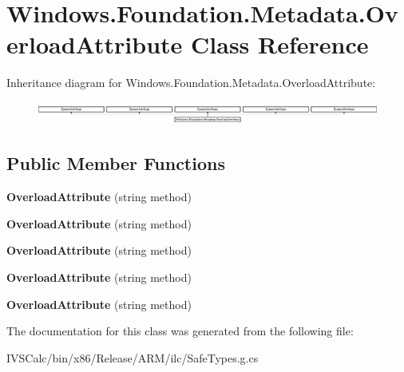 \hypertarget{class_windows_1_1_foundation_1_1_metadata_1_1_overload_attribute}{}\section{Windows.\+Foundation.\+Metadata.\+Overload\+Attribute Class Reference}
\label{class_windows_1_1_foundation_1_1_metadata_1_1_overload_attribute}
Inheritance diagram for Windows.\+Foundation.\+Metadata.\+Overload\+Attribute\+:\begin{figure}[H]
\begin{center}
\leavevmode
\includegraphics[height=0.754209cm]{class_windows_1_1_foundation_1_1_metadata_1_1_overload_attribute}
\end{center}
\end{figure}
\subsection*{Public Member Functions}
\begin{DoxyCompactItemize}
\item 
\mbox{\label{class_windows_1_1_foundation_1_1_metadata_1_1_overload_attribute_a9c4128021b8cc515bccee33fedad6a54}} 
{\bfseries Overload\+Attribute} (string method)
\item 
\mbox{\label{class_windows_1_1_foundation_1_1_metadata_1_1_overload_attribute_a9c4128021b8cc515bccee33fedad6a54}} 
{\bfseries Overload\+Attribute} (string method)
\item 
\mbox{\label{class_windows_1_1_foundation_1_1_metadata_1_1_overload_attribute_a9c4128021b8cc515bccee33fedad6a54}} 
{\bfseries Overload\+Attribute} (string method)
\item 
\mbox{\label{class_windows_1_1_foundation_1_1_metadata_1_1_overload_attribute_a9c4128021b8cc515bccee33fedad6a54}} 
{\bfseries Overload\+Attribute} (string method)
\item 
\mbox{\label{class_windows_1_1_foundation_1_1_metadata_1_1_overload_attribute_a9c4128021b8cc515bccee33fedad6a54}} 
{\bfseries Overload\+Attribute} (string method)
\end{DoxyCompactItemize}


The documentation for this class was generated from the following file\+:\begin{DoxyCompactItemize}
\item 
I\+V\+S\+Calc/bin/x86/\+Release/\+A\+R\+M/ilc/Safe\+Types.\+g.\+cs\end{DoxyCompactItemize}
